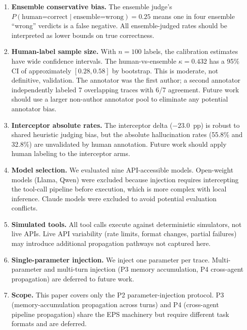 \documentclass[preprint,review,12pt,3p]{elsarticle}
\begin{document}
\begin{enumerate}
  \item \textbf{Ensemble conservative bias.}
    The ensemble judge's $P(\text{human=correct} \mid
    \text{ensemble=wrong})=0.25$ means one in four ensemble ``wrong''
    verdicts is a false negative.
    All ensemble-judged rates should be interpreted as lower bounds on
    true correctness.

  \item \textbf{Human-label sample size.}
    With $n{=}100$ labels, the calibration estimates have wide confidence
    intervals.
    The human-vs-ensemble $\kappa{=}0.432$ has a 95\% CI of approximately
    $[0.28, 0.58]$ by bootstrap.
    This is moderate, not definitive, validation.
    The annotator was the first author; a second annotator independently
    labeled 7 overlapping traces with 6/7 agreement.
    Future work should use a larger non-author annotator pool to
    eliminate any potential annotator bias.

  \item \textbf{Interceptor absolute rates.}
    The interceptor delta ($-23.0$~pp) is robust to shared heuristic
    judging bias, but the absolute hallucination rates (55.8\% and
    32.8\%) are unvalidated by human annotation.
    Future work should apply human labeling to the interceptor arms.

  \item \textbf{Model selection.}
    We evaluated nine API-accessible models.
    Open-weight models (Llama, Qwen) were excluded because injection
    requires intercepting the tool-call pipeline before execution, which
    is more complex with local inference.
    Claude models were excluded to avoid potential evaluation conflicts.

  \item \textbf{Simulated tools.}
    All tool calls execute against deterministic simulators, not live
    APIs.
    Live API variability (rate limits, format changes, partial failures)
    may introduce additional propagation pathways not captured here.

  \item \textbf{Single-parameter injection.}
    We inject one parameter per trace.
    Multi-parameter and multi-turn injection (P3 memory accumulation,
    P4 cross-agent propagation) are deferred to future work.

  \item \textbf{Scope.}
    This paper covers only the P2 parameter-injection protocol.
    P3 (memory-accumulation propagation across turns) and P4
    (cross-agent pipeline propagation) share the EPS machinery but
    require different task formats and are deferred.


\end{enumerate}
\end{document}

